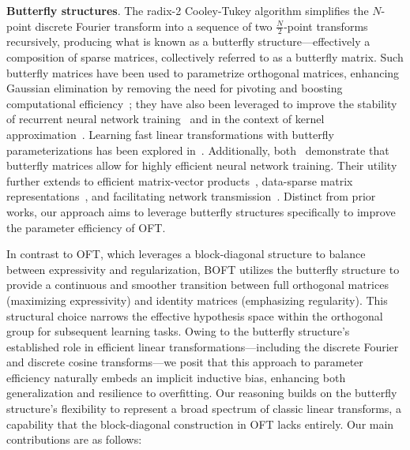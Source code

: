 \textbf{Butterfly structures}. The radix-2 Cooley-Tukey algorithm simplifies the $N$-point discrete Fourier transform into a sequence of two $\frac{N}{2}$-point transforms recursively, producing what is known as a butterfly structure—effectively a composition of sparse matrices, collectively referred to as a butterfly matrix. Such butterfly matrices have been used to parametrize orthogonal matrices, enhancing Gaussian elimination by removing the need for pivoting and boosting computational efficiency~\cite{parker1995random}; they have also been leveraged to improve the stability of recurrent neural network training~\cite{jing2017tunable} and in the context of kernel approximation~\cite{munkhoeva2018quadrature}. Learning fast linear transformations with butterfly parameterizations has been explored in~\cite{dao2019learning,dao2019kaleidoscope}. Additionally, both~\cite{chen2022pixelated,dao2022monarch} demonstrate that butterfly matrices allow for highly efficient neural network training. Their utility further extends to efficient matrix-vector products~\cite{michielssen1996multilevel,o2010algorithm}, data-sparse matrix representations~\cite{li2015butterfly}, and facilitating network transmission~\cite{klasing1994broadcasting,li2003linear,rajasingh2016transmission}. Distinct from prior works, our approach aims to leverage butterfly structures specifically to improve the parameter efficiency of OFT.

In contrast to OFT, which leverages a block-diagonal structure to balance between expressivity and regularization, BOFT utilizes the butterfly structure to provide a continuous and smoother transition between full orthogonal matrices (maximizing expressivity) and identity matrices (emphasizing regularity). This structural choice narrows the effective hypothesis space within the orthogonal group for subsequent learning tasks. Owing to the butterfly structure’s established role in efficient linear transformations—including the discrete Fourier and discrete cosine transforms—we posit that this approach to parameter efficiency naturally embeds an implicit inductive bias, enhancing both generalization and resilience to overfitting. Our reasoning builds on the butterfly structure’s flexibility to represent a broad spectrum of classic linear transforms, a capability that the block-diagonal construction in OFT lacks entirely. Our main contributions are as follows:

